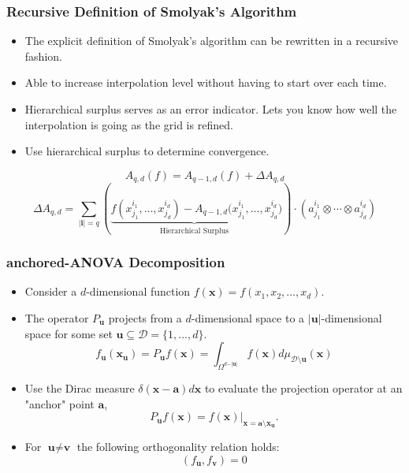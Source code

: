\documentclass{beamer}
\begin{document}
\begin{frame}
\frametitle{Recursive Definition of Smolyak's Algorithm}

\begin{itemize}
  \item The explicit definition of Smolyak's algorithm can be rewritten in a recursive fashion.
  \item Able to increase interpolation level without having to start over each time.
  \item Hierarchical surplus serves as an error indicator. Lets you know how well the interpolation is going as the grid is refined.
  \item Use hierarchical surplus to determine convergence.
\end{itemize}

\begin{equation}
 A_{q,d}(f) = A_{q-1,d}(f) + \Delta A_{q,d} \nonumber
\end{equation}
\begin{equation} 
 \Delta A_{q,d} = \sum_{\vert\textbf{i}\vert=q}
  \left( \underbrace{f(x_{j_1}^{i_1},...,x_{j_d}^{i_d}) - 
   A_{q-1,d}(x_{j_1}^{i_1},...,x_{j_d}^{i_d}}_{\text{Hierarchical Surplus}})\right)\cdot
    \left(a_{j_1}^{i_1}\otimes\cdots\otimes a_{j_d}^{i_d}\right) \nonumber
\end{equation}

\end{frame}
\begin{frame}
\frametitle{anchored-ANOVA Decomposition}

\begin{itemize}
  \item Consider a $d$-dimensional function $f(\textbf{x}) = f(x_1, x_2, ..., x_d)$.
  \item The operator $P_{\textbf{u}}$ projects from a $d$-dimensional space to a $\vert\textbf{u}\vert$-dimensional space for some set $\textbf{u}\subseteq \mathcal{D} = \lbrace 1,...,d\rbrace$.  
\begin{equation}
 f_{\textbf{u}}(\textbf{x}_{\textbf{u}}) = P_{\textbf{u}}f\left(\textbf{x}\right) =
  \int_{\Omega^{d-\vert\textbf{u}\vert}} 
   f\left(\textbf{x}\right)d\mu_{\mathcal{D}\setminus\textbf{u}}
    \left(\textbf{x}\right) \nonumber
\end{equation}
  \item Use the Dirac measure $\delta(\textbf{x}-\textbf{a})d\textbf{x}$ to evaluate the projection operator at an "anchor" point $\textbf{a}$,
\begin{equation} 
 P_{\textbf{u}}f\left(\textbf{x}\right) = 
  f\left(\textbf{x}\right)\vert_{\textbf{x}=
   \textbf{a}\setminus\textbf{x}_{\textbf{u}}}. \nonumber
\end{equation}
  \item For $\textbf{u}\neq\textbf{v}$ the following orthogonality relation holds:
\begin{equation} 
 \left(f_{\textbf{u}},f_{\textbf{v}}\right) = 0 \nonumber
\end{equation}
\end{itemize}

\end{frame}
\end{document}
